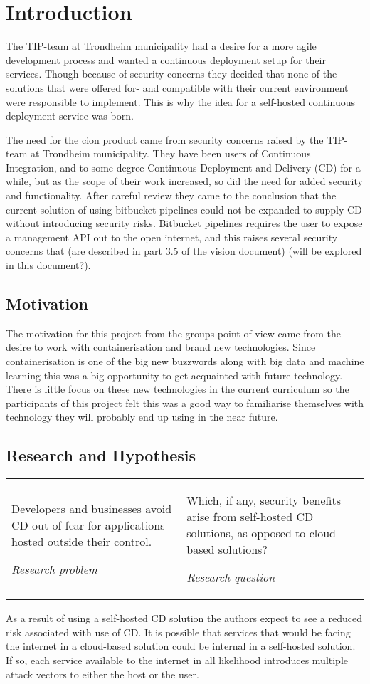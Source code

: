 \chapter{Introduction}
\label{chap:introduction}
The TIP-team at Trondheim municipality had a desire for a more agile development process and wanted a continuous deployment setup for their services. Though because of security concerns they decided that none of the solutions that were offered for- and compatible with their current environment were responsible to implement. This is why the idea for a self-hosted continuous deployment service was born.

The need for the cion product came from security concerns raised by the TIP-team at Trondheim municipality. They have been users of Continuous Integration, and to some degree Continuous Deployment and Delivery (CD) for a while, but as the scope of their work increased, so did the need for added security and functionality. After careful review they came to the conclusion that the current solution of using bitbucket pipelines could not be expanded to supply CD without introducing security risks. Bitbucket pipelines requires the user to expose a management API out to the open internet, and this raises several security concerns that (are described in part 3.5 of the vision document) (will be explored in this document?).

\section{Motivation}
The motivation for this project from the groups point of view came from the desire to work with containerisation and brand new technologies. Since containerisation is one of the big new buzzwords along with big data and machine learning this was a big opportunity to get acquainted with future technology. There is little focus on these new technologies in the current curriculum so the participants of this project felt this was a good way to familiarise themselves with technology they will probably end up using in the near future.

\section{Research and Hypothesis}
\begin{tabularx}{\linewidth}{X X}
    \epigraph{Developers and businesses avoid CD out of fear for applications hosted outside their control.}{\textit{Research problem}}
    & \epigraph{Which, if any, security benefits arise from self-hosted CD solutions, as opposed to cloud-based solutions?}{\textit{Research question}}
\end{tabularx}
As a result of using a self-hosted CD solution the authors expect to see a reduced risk associated with use of CD. It is possible that services that would be facing the internet in a cloud-based solution could be internal in a self-hosted solution. If so, each service available to the internet in all likelihood introduces multiple attack vectors to either the host or the user.

